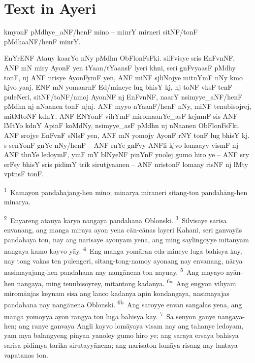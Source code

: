 \documentclass[12pt,paper=letter]{scrartcl}
\newcommand{\tsup}[1]{\textsuperscript{#1}} %
\newenvironment{ayeri}{
    \doublespacing
    \begin{multicols}{2}
    \Tagati
}{
    \end{multicols} \par
}
\begin{document}
\section{Text in Ayeri}
\begin{ayeri}
\noindent
kmyonF pMdhye\_aNF/henF mino – minrY mirneri sitNF/tonF pMdhaaNF/henF minrY.

EnYrENF Atauy kaarYo nNy pMdhn ObFlonFsFki.
silF\-visye sris EnFvnNF, ANF mN miry AyonF yen tYaan/tYaansF lyeri khni, seri 
    gnFvyaasF pMdhy tonF, nj ANF nrisye AyonF\-ymF yen, ANF miNF sjliNojye 
    mitnYmF nNy kmo kjvo yaaj. ENF mN yomaarnF Ed/mineye lug bhisY kj, nj toNF 
    vksF tenF puleNeri, sitNF/toNF/nmoj AyonNF nj EnFvnNF, naarY 
    nsimyye\_aNF/henF pMdhn nj nNaanen tonF njnj. 
ANF myyo nYaanF/henF nNy, miNF tenubisojrej, mitMtoNF kdnY.
ANF ENYonF vihYmF miromaanYe\_asF kejnmF sis ANF lMtYo kdnY ApinF koMdNy, 
    nsimyye\_asF pMdhn nj nNaanen ObFlonFsFki.
ANF srojye EnFvnF sNlsF yen, ANF mN yomojy AyonF rNY tonF lug bhisY kj.
s senYonF gnYe nNy/henF – ANF rnYe gnF\-vy ANFli kjvo lomaayy vismF nj ANF 
    thnYe ledoymF, ymF mY blNyeNF pinYnF ynolej gumo hiro ye – ANF sry erFsy
    bhisY sris pidimY trik sirutjyaanen – ANF nristonF lomaay risNF nj lMty
    vptnsF tonF.
\end{ayeri}

\noindent
\tsup{1}~Kamayon pandahajang-hen mino; minarya miraneri sitang-ton 
    pandahāng-hen minarya.

\tsup{2}~Enyareng atauya kāryo nangaya pandahana Oblonski.
\tsup{3}~Silvisaye sarisa envanang, ang manga miraya ayon yena cān-cānas layeri 
    Kahani, seri ganvayās pandahaya ton, nay ang narisaye ayonyam yena, ang 
    ming saylingoyye mitanyam nangaya kamo kayvo yāy.
\tsup{4}~Eng manga yomāran eda-mineye luga bahisya kay, nay tong vakas ten 
    pulengeri, sitang-tong-namoy ayonang nay envanang, nārya nasimayajang-hen 
    pandahana nay nangānena ton naynay.
\tsup{5}~Ang mayayo nyān-hen nangaya, ming tenubisoyrey, mitantong kadanya.
\tsup{6a}~Ang engyon vihyam miromānjas keynam sisa ang lanco kadanya apin 
    kondangaya, nasimayajas pandahana nay nangānena Oblonski.
\tsup{6b}~Ang saroyye envan sangalas yena, ang manga yomoyya ayon rangya ton 
    luga bahisya kay.
\tsup{7}~Sa senyon ganye nangaya-hen; ang ranye ganvaya Angli kayvo lomāyaya 
    visam nay ang tahanye ledoyam, yam mya balangyeng pinyan yanoley gumo hiro 
    ye; ang saraya ersaya bahisya sarisa pidimya tarika sirutayyānena; ang 
    narisaton lomāya risang nay lantaya vapatanas ton.
\end{document}

